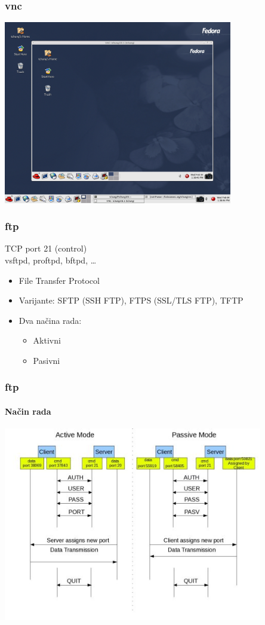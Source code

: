 \documentclass[t,table,usenames,dvipsnames]{beamer}
\begin{document}
\begin{frame}
	\frametitle{vnc}
	\centering
	\includegraphics[width=0.75\textwidth]{vnc-desktop.png}

\end{frame}






\begin{frame}
	\frametitle{ftp}
	
	TCP port 21 (control)\\
	vsftpd, proftpd, bftpd, \ldots

	\begin{itemize}	
		\item File Transfer Protocol
		\item Varijante: SFTP (SSH FTP), FTPS (SSL/TLS FTP), TFTP
		
		\item Dva načina rada:
		\begin{itemize}
			\item Aktivni
			\item Pasivni
		\end{itemize}
	\end{itemize}
\end{frame}

\begin{frame}
	\frametitle{ftp}
	\framesubtitle{Način rada}
	\centering
	\includegraphics[width=0.85\textwidth]{ftp.jpg}
\end{frame}
\end{document}
